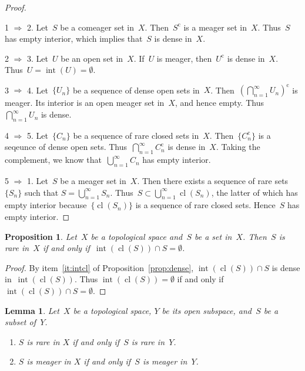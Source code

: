 \documentclass[11pt,a4paper]{article}
\newtheorem{lemma}{Lemma}[section]
\newtheorem{proposition}{Proposition}[section]
\theoremstyle{definition}
\newcommand{\co}{{\mathrm{c}}}
\DeclareMathOperator{\inter}{int}
\DeclareMathOperator{\cl}{cl}
\numberwithin{equation}{section}
\begin{document}
\begin{proof}~

  1 $\Rightarrow$ 2. 
  Let~$S$ be a comeager set in~$X$. Then~$S^\co$ is a meager
  set in~$X$. Thus~$S$ has empty interior, which implies that~$S$ is dense in~$X$. 

  2 $\Rightarrow$ 3. 
  Let~$U$ be an open set in~$X$.
  If~$U$ is meager, then~$U^\co$ is dense in~$X$. Thus~$U=\!\inter(U) \!= \emptyset$.

  3 $\Rightarrow$ 4. 
  Let~$\{U_n\}$ be a sequence of dense open sets in~$X$. Then~$(\bigcap_{n=1}^\infty U_n)^\co$ is
  meager. Its interior is an open meager set in~$X$, and hence empty. Thus~$\bigcap_{n=1}^\infty
  U_n$  is dense. 

  4 $\Rightarrow$ 5. 
  Let~$\{C_n\}$ be a sequence of rare closed sets in~$X$. Then~$\{C_n^\co\}$ is a seqeunce
  of dense open sets. Thus~$\bigcap_{n=1}^\infty C_n^\co$ is dense in~$X$. Taking the complement, we
  know that~$\bigcup_{n=1}^\infty C_n$ has empty interior.   

  5 $\Rightarrow$ 1. 
  Let~$S$ be a meager set in~$X$. Then there exists a sequence of rare sets~$\{S_n\}$ such that 
  $S=\bigcup_{n=1}^\infty S_n$. Thus~$S\subset \bigcup_{n=1}^\infty \cl(S_n)$, the latter of which has
  empty interior because~$\{\cl(S_n)\}$ is a sequence of rare closed sets. 
  Hence~$S$ has empty interior. 
\end{proof}

\begin{proposition}
  \label{prop:intclr}
  Let~$X$ be a topological space and~$S$ be a set in~$X$. Then~$S$ is rare in~$X$ if and only
  if~$\inter(\cl(S)) \cap S = \emptyset$.
\end{proposition}

\begin{proof}
  By item~\ref{it:intcl} of Proposition~\ref{prop:dense}, $\inter(\cl(S)) \cap S$ is dense
  in~$\inter(\cl(S))$. Thus $\inter(\cl(S)) = \emptyset$ if and only if $\inter(\cl(S)) \cap S = \emptyset$.
\end{proof}

\begin{lemma}
  \label{lem:openb}
  Let~$X$ be a topological space, $Y$ be its open subspace, and~$S$ be a subset of~$Y$. 
  \begin{enumerate}
    \item $S$ is rare in $X$ if and only if~$S$ is rare in~$Y$.
    \item $S$ is meager in $X$ if and only if~$S$ is meager in~$Y$.
  \end{enumerate}
\end{lemma}
\end{document}
